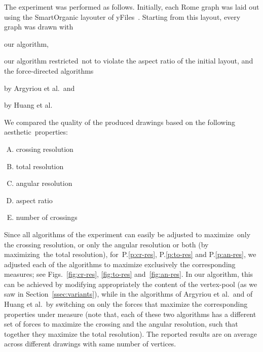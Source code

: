\documentclass[runningheads]{llncs}
\begin{document}
The experiment was performed as follows. Initially, each Rome graph was laid out using the SmartOrganic layouter of yFiles~\cite{DBLP:books/sp/04/WieseE004}. Starting from this layout, every graph was drawn with
\begin{inparaenum}[(i)]
\item our algorithm,
\item our algorithm restricted~not to violate the aspect ratio of the initial layout, and the force-directed algorithms
\item by Argyriou et al.\ and
\item by Huang et al.
\end{inparaenum}
%
We compared the quality of the produced drawings based on the following aesthetic~properties:
%
\begin{multicols}{2}
\begin{enumerate}[P.1.]
\item \label{p:cr-res} crossing resolution
\item \label{p:to-res} total resolution
\item \label{p:an-res} angular resolution
\columnbreak
\item \label{p:as-rat} aspect ratio
\item \label{p:no-xing} number of crossings
\end{enumerate}
\end{multicols}
%
Since all algorithms of the experiment can easily be adjusted to maximize~only the crossing resolution, or only the angular resolution or both (by maximizing~the total resolution), for~P.\ref*{p:cr-res}, P.\ref*{p:to-res} and P.\ref*{p:an-res}, we adjusted each of the algorithms to maximize exclusively the corresponding measures; see Figs.~\ref{fig:cr-res}, \ref{fig:to-res} and~\ref{fig:an-res}. In our algorithm, this can be achieved by modifying appropriately the content of the vertex-pool (as we saw in Section~\ref{ssec:variants}), while in the algorithms of Argyriou et al.\ and of Huang et al.\ by switching on only the forces that maximize the corresponding properties under measure (note that, each of these two algorithms has a different set of forces to maximize the crossing and the angular resolution, such that together they maximize the total resolution). The reported results are on average across different drawings with same number of vertices.
\end{document}
